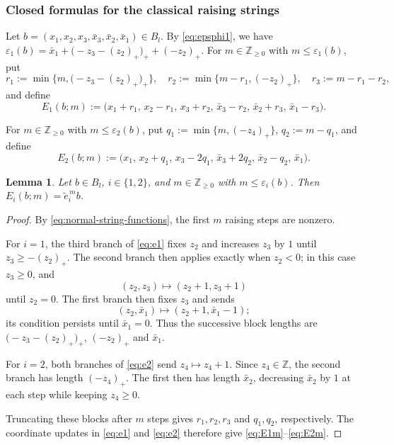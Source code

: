 \documentclass[11pt,reqno]{amsart}
\newcommand{\Zge}{\mathbb Z_{\ge 0}}
\numberwithin{table}{section}
\numberwithin{equation}{section}
\theoremstyle{plain}
\newtheorem{lemma}[theorem]{Lemma}
\theoremstyle{definition}
\begin{document}
\subsubsection{Closed formulas for the classical raising strings}

Let \(b=(x_1,x_2,x_3,\bar x_3,\bar x_2,\bar x_1)\in B_l\).
By \eqref{eq:epsphi1}, we have $\varepsilon_1(b)
=
\bar x_1+
\bigl(-z_3-(z_2)_+\bigr)_+
+(-z_2)_+$.
For \(m\in\Zge\) with \(m\le\varepsilon_1(b)\), put
\[
r_1:=\min\bigl\{m,\bigl(-z_3-(z_2)_+\bigr)_+\bigr\},
\quad
r_2:=\min\{m-r_1,(-z_2)_+\},
\quad
r_3:=m-r_1-r_2,
\]
and define
\begin{equation}\label{eq:E1m}
	E_1(b;m)
	:=
	\bigl(
	x_1+r_1,\,
	x_2-r_1,\,
	x_3+r_2,\,
	\bar x_3-r_2,\,
	\bar x_2+r_3,\,
	\bar x_1-r_3
	\bigr).
\end{equation}

For \(m\in\Zge\) with \(m\le\varepsilon_2(b)\), put $q_1:=\min\{m,(-z_4)_+\}$, $q_2:=m-q_1$,
and define
\begin{equation}\label{eq:E2m}
	E_2(b;m)
	:=
	\bigl(
	x_1,\,
	x_2+q_1,\,
	x_3-2q_1,\,
	\bar x_3+2q_2,\,
	\bar x_2-q_2,\,
	\bar x_1
	\bigr).
\end{equation}

\begin{lemma}\label{lem:closed-string}
	Let \(b\in B_l\), \(i\in\{1,2\}\), and
	\(m\in\Zge\) with \(m\le\varepsilon_i(b)\).
	Then \(E_i(b;m)=\widetilde e_i^{\,m}b\).
\end{lemma}

\begin{proof}
	By \eqref{eq:normal-string-functions}, the first \(m\) raising
	steps are nonzero.
	
	For \(i=1\), the third branch of \eqref{eq:e1} fixes \(z_2\)
	and increases \(z_3\) by \(1\) until \(z_3\ge-(z_2)_+\).
	The second branch then applies exactly when \(z_2<0\);
	in this case \(z_3\ge0\), and
	\[
	(z_2,z_3)\longmapsto(z_2+1,z_3+1)
	\]
	until \(z_2=0\).
	The first branch then fixes \(z_3\) and sends
	\[
	(z_2,\bar x_1)\longmapsto(z_2+1,\bar x_1-1);
	\]
	its condition persists until \(\bar x_1=0\).
	Thus the successive block lengths are $\bigl(-z_3-(z_2)_+\bigr)_+$, $	(-z_2)_+$ and $\bar x_1$.

	
	For \(i=2\), both branches of \eqref{eq:e2} send
	\(z_4\mapsto z_4+1\).
	Since \(z_4\in\mathbb Z\), the second branch has length
	\((-z_4)_+\).
	The first then has length \(\bar x_2\), decreasing \(\bar x_2\)
	by \(1\) at each step while keeping \(z_4\ge0\).
	
	Truncating these blocks after \(m\) steps gives
	\(r_1,r_2,r_3\) and \(q_1,q_2\), respectively.
	The coordinate updates in \eqref{eq:e1} and \eqref{eq:e2}
	therefore give \eqref{eq:E1m}--\eqref{eq:E2m}.
\end{proof}
\end{document}
